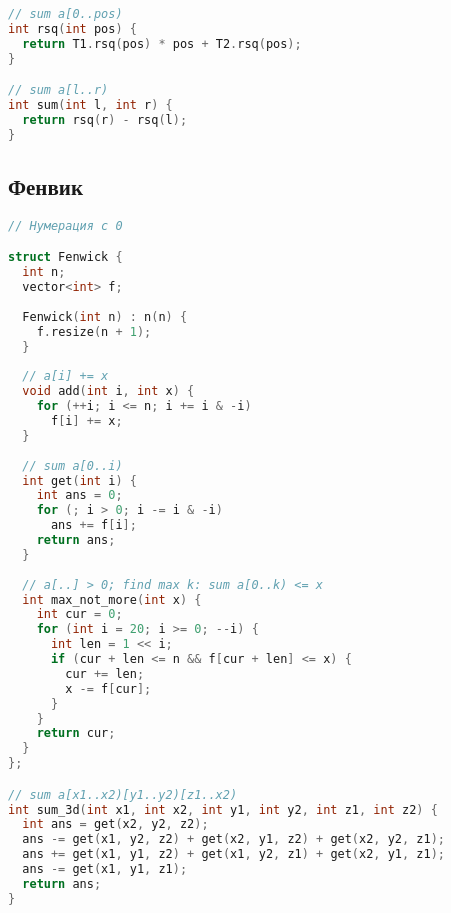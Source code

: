 \documentclass[10pt,a4paper,landscape,twosided]{extarticle}
\begin{document}
\begin{multicols*}{3}
\begin{lstlisting}[language=C++]
// sum a[0..pos)
int rsq(int pos) {
  return T1.rsq(pos) * pos + T2.rsq(pos);
}

// sum a[l..r)
int sum(int l, int r) {
  return rsq(r) - rsq(l);
}

\end{lstlisting}

\subsection{Фенвик}
\begin{lstlisting}[language=C++]
// Нумерация с 0

struct Fenwick {
  int n;
  vector<int> f;
 
  Fenwick(int n) : n(n) {
    f.resize(n + 1);
  }
 
  // a[i] += x
  void add(int i, int x) {
    for (++i; i <= n; i += i & -i)
      f[i] += x;
  }
 
  // sum a[0..i)
  int get(int i) {
    int ans = 0;
    for (; i > 0; i -= i & -i)
      ans += f[i];
    return ans;
  }
 
  // a[..] > 0; find max k: sum a[0..k) <= x
  int max_not_more(int x) {
    int cur = 0;
    for (int i = 20; i >= 0; --i) {
      int len = 1 << i;
      if (cur + len <= n && f[cur + len] <= x) {
        cur += len;
        x -= f[cur];
      }
    }
    return cur;
  }
};

// sum a[x1..x2)[y1..y2)[z1..x2)
int sum_3d(int x1, int x2, int y1, int y2, int z1, int z2) {
  int ans = get(x2, y2, z2);
  ans -= get(x1, y2, z2) + get(x2, y1, z2) + get(x2, y2, z1);
  ans += get(x1, y1, z2) + get(x1, y2, z1) + get(x2, y1, z1);
  ans -= get(x1, y1, z1);
  return ans;
}
\end{lstlisting}


\end{multicols*}
\end{document}
